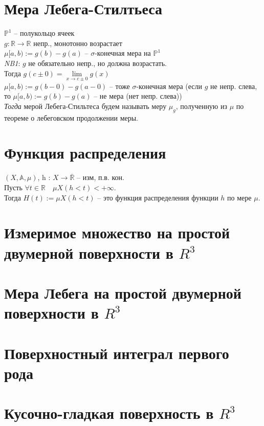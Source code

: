 \documentclass[paper=a4, fontsize=17pt]{article}
\begin{document}
\section{Мера Лебега-Стилтьеса}
$\mathbb{P}^1$ -- полукольцо ячеек \\
$g : \mathbb{R} \rightarrow \mathbb{R}$ непр., монотонно возрастает \\
$\mu [a, b):=g(b) - g(a)$ -- $\sigma$-конечная мера на $\mathbb{P}^1$ \\
 
\emph{NB1}: $g$ не обязательно непр., но должна возрастать. \\
Тогда $g(c \pm 0)=\lim\limits_{x \rightarrow c \pm 0} g(x)$ \\ 
$\mu [a, b):=g(b - 0) - g(a - 0)$ -- тоже $\sigma$-конечная мера (если $g$ не непр. слева, то $\mu [a, b):=g(b) - g(a)$ -- не мера (нет непр. слева)) \\


\emph{Тогда} мерой Лебега-Стильтеса будем называть меру $\mu_g$, полученную из $\mu$ по теореме о лебеговском продолжении меры.

\section{Функция распределения}
$(X, \mathds{A}, \mu) $, h : $X \rightarrow \overline{\mathbb{R}}$ -- изм, п.в. кон.\\

Пусть $\forall t \in \mathbb{R}\quad \mu X(h < t) < +\infty$.\\
Тогда $H(t):=\mu X(h < t)$ -- это функция распределения функции $h$ по мере $\mu$.
 
\section{Измеримое множество на простой двумерной поверхности в $R^3$}

\section{Мера Лебега на простой двумерной поверхности в $R^3$}

\section{Поверхностный интеграл первого рода}

\section{Кусочно-гладкая поверхность в $R^3$}
\end{document}
